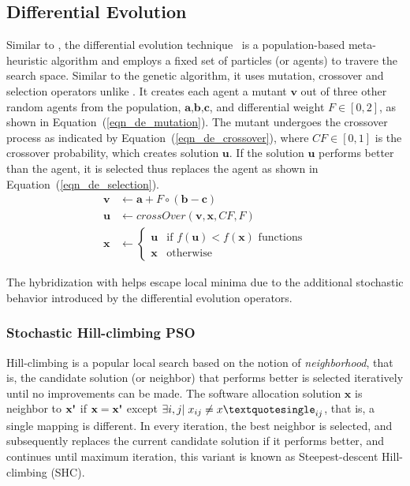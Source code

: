 \subsection{Differential Evolution}
Similar to \pso{}, the differential evolution technique~\cite{Storn1997DifferentialSpaces,Das2016RecentSurvey} is a population-based meta-heuristic algorithm and employs a fixed set of particles (or agents) to travere the search space. Similar to the genetic algorithm, it uses mutation, crossover and selection operators unlike \pso{}. It creates each agent \ttx a mutant $\textbf{v}$ out of three other random agents from the population, $\textbf{a,b,c}$, and differential weight $F\in[0,2]$, as shown in Equation~(\ref{eqn_de_mutation}). The mutant undergoes the crossover process as indicated by Equation~(\ref{eqn_de_crossover}), where $CF\in[0,1]$ is the crossover probability, which creates solution $\textbf{u}$. If the solution $\textbf{u}$ performs better than the agent, it is selected thus replaces the agent \ttx as shown in Equation~(\ref{eqn_de_selection}).
\begin{align}
    \label{eqn_de_mutation}
    \textbf{v} & \leftarrow   \textbf{a} + F\circ(\textbf{b}-\textbf{c})\\
    \label{eqn_de_crossover}
    \textbf{u}&\leftarrow crossOver(\textbf{v},\textbf{x},CF,F)\\
    \label{eqn_de_selection}
    \textbf{x} &\leftarrow 
    \begin{cases}
    \textbf{u} & \mbox{if } f(\textbf{u}) < f(\textbf{x})\mbox{ functions}\\
    \textbf{x} & \mbox{otherwise }
    \end{cases}
\end{align}

The hybridization with \de{} helps \pso{} escape local minima due to the additional stochastic behavior introduced by the differential evolution operators.

\subsubsection{Stochastic Hill-climbing PSO}
Hill-climbing is a popular local search based on the notion of \textit{neighborhood}, that is, the candidate solution (or neighbor) that performs better is selected iteratively until no improvements can be made. The software allocation solution $\textbf{x}$ is neighbor to $\textbf{x\textquotesingle}$ if $\textbf{x}=\textbf{x\textquotesingle}$ except $\exists i,j|\;x_{ij}\neq x\textquotesingle_{ij}$, that is, a single mapping is different. In every iteration, the best neighbor is selected, and subsequently replaces the current candidate solution if it performs better, and continues until maximum iteration, this variant is known as Steepest-descent Hill-climbing (SHC).

